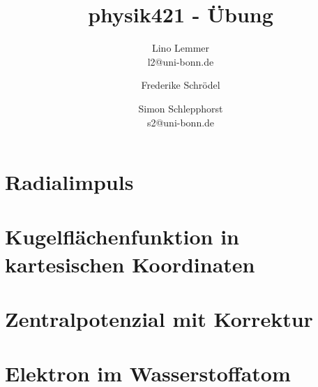 

\setcounter{thezettel}{11}
\renewcommand\thesection{\arabic{thezettel}.\arabic{section}}



\title{physik421 - Übung }
\author{Lino Lemmer \\ \small{l2@uni-bonn.de} \and Frederike Schrödel \and Simon Schlepphorst\\ \small{s2@uni-bonn.de}}


\maketitle

\section{Radialimpuls} %
\label{sec:Radialimpuls}


\section{Kugelflächenfunktion in kartesischen Koordinaten} %
\label{sec:Kugelflächenfunktion in kartesischen Koordinaten}


\section{Zentralpotenzial mit Korrektur} %
\label{sec:Zentralpotenzial mit Korrektur}


\section{Elektron im Wasserstoffatom} %
\label{sec:Elektron im Wasserstoffatom}



